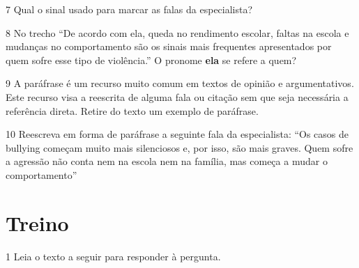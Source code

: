 
\num{7} Qual o sinal usado para marcar as falas da especialista?


\num{8} No trecho ``De acordo com ela, queda no rendimento escolar, faltas na
escola e mudanças no comportamento são os sinais mais frequentes
apresentados por quem sofre esse tipo de violência.'' O pronome \textbf{ela} se
refere a quem?


\num{9} A paráfrase é um recurso muito comum em textos de opinião e
argumentativos. Este recurso visa a reescrita de alguma fala ou
citação sem que seja necessária a referência direta. Retire do texto
um exemplo de paráfrase.


\num{10} Reescreva em forma de paráfrase a seguinte fala da especialista: ``Os 
casos de bullying começam muito mais silenciosos e, por isso, são mais graves. 
Quem sofre a agressão não conta nem na escola nem na família, mas começa a mudar 
o comportamento''


\section{Treino}

\num{1} Leia o texto a seguir para responder à pergunta.

